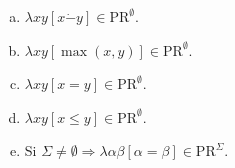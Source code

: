   \begin{lemma}
    \begin{enumerate}[a)]
      \item $\lambda xy \left[x \dot{-}y\right] \in \mathrm{PR}^{\emptyset}$.
      \item $\lambda xy \left[\max (x,y)\right] \in \mathrm{PR}^{\emptyset}$.
      \item $\lambda xy \left[x=y\right] \in \mathrm{PR}^{\emptyset}$.
      \item $\lambda xy \left[x \leq y\right] \in \mathrm{PR}^{\emptyset}$.
      \item Si $\Sigma \neq \emptyset \Rightarrow \lambda \alpha \beta \left[\alpha = \beta\right] \in
        \mathrm{PR}^{\Sigma}$.
    \end{enumerate}
  \end{lemma}
